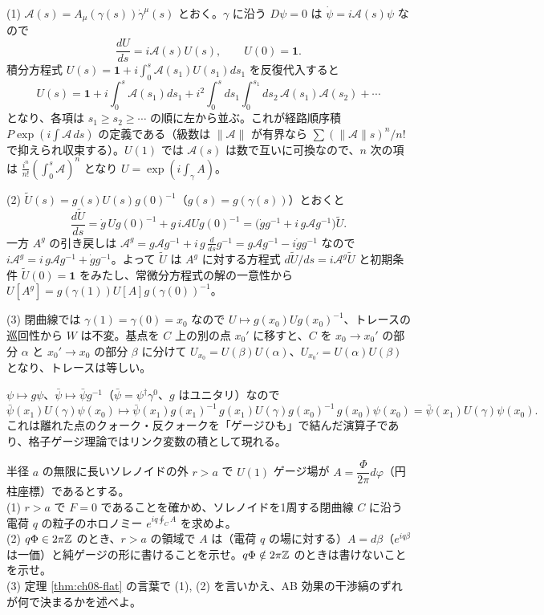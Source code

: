 \begin{solution}
(1) $\mathcal A(s)=A_\mu(\gamma(s))\dot\gamma^\mu(s)$ とおく。$\gamma$ に沿う $D\psi=0$ は $\dot\psi=i\mathcal A(s)\psi$ なので
\[
\frac{dU}{ds}=i\mathcal A(s)U(s),\qquad U(0)=\mathbf 1 .
\]
積分方程式 $U(s)=\mathbf 1+i\int_0^s\mathcal A(s_1)U(s_1)ds_1$ を反復代入すると
\[
U(s)=\mathbf 1+i\int_0^s\!\mathcal A(s_1)ds_1+i^2\!\int_0^s\!ds_1\!\int_0^{s_1}\!ds_2\,\mathcal A(s_1)\mathcal A(s_2)+\cdots
\]
となり、各項は $s_1\ge s_2\ge\cdots$ の順に左から並ぶ。これが経路順序積 $P\exp(i\int\mathcal A\,ds)$ の定義である（級数は $\lVert\mathcal A\rVert$ が有界なら $\sum(\lVert\mathcal A\rVert s)^n/n!$ で抑えられ収束する）。$U(1)$ では $\mathcal A(s)$ は数で互いに可換なので、$n$ 次の項は $\frac{i^n}{n!}(\int_0^s\mathcal A)^n$ となり $U=\exp(i\int_\gamma A)$。

(2) $\tilde U(s)=g(s)U(s)g(0)^{-1}$（$g(s)=g(\gamma(s))$）とおくと
\[
\frac{d\tilde U}{ds}=\dot g\,Ug(0)^{-1}+g\,i\mathcal AUg(0)^{-1}=\bigl(\dot g g^{-1}+i\,g\mathcal Ag^{-1}\bigr)\tilde U .
\]
一方 $A^g$ の引き戻しは $\mathcal A^g=g\mathcal Ag^{-1}+i\,g\,\tfrac{d}{ds}g^{-1}=g\mathcal Ag^{-1}-i\dot gg^{-1}$ なので $i\mathcal A^g=i\,g\mathcal Ag^{-1}+\dot gg^{-1}$。よって $\tilde U$ は $A^g$ に対する方程式 $d\tilde U/ds=i\mathcal A^g\tilde U$ と初期条件 $\tilde U(0)=\mathbf 1$ をみたし、常微分方程式の解の一意性から $U[A^g]=g(\gamma(1))U[A]g(\gamma(0))^{-1}$。

(3) 閉曲線では $\gamma(1)=\gamma(0)=x_0$ なので $U\mapsto g(x_0)Ug(x_0)^{-1}$、トレースの巡回性から $W$ は不変。基点を $C$ 上の別の点 $x_0'$ に移すと、$C$ を $x_0\to x_0'$ の部分 $\alpha$ と $x_0'\to x_0$ の部分 $\beta$ に分けて $U_{x_0}=U(\beta)U(\alpha)$、$U_{x_0'}=U(\alpha)U(\beta)$ となり、トレースは等しい。

$\psi\mapsto g\psi$、$\bar\psi\mapsto\bar\psi g^{-1}$（$\bar\psi=\psi^\dagger\gamma^0$、$g$ はユニタリ）なので
\[
\bar\psi(x_1)U(\gamma)\psi(x_0)\mapsto\bar\psi(x_1)g(x_1)^{-1}\,g(x_1)U(\gamma)g(x_0)^{-1}\,g(x_0)\psi(x_0)=\bar\psi(x_1)U(\gamma)\psi(x_0).
\]
これは離れた点のクォーク・反クォークを「ゲージひも」で結んだ演算子であり、格子ゲージ理論ではリンク変数の積として現れる。
\end{solution}

\begin{problem}[難易度 A]\label{ch08-prob-ab}
半径 $a$ の無限に長いソレノイドの外 $r>a$ で $U(1)$ ゲージ場が $A=\dfrac{\Phi}{2\pi}d\varphi$（円柱座標）であるとする。\\
(1) $r>a$ で $F=0$ であることを確かめ、ソレノイドを1周する閉曲線 $C$ に沿う電荷 $q$ の粒子のホロノミー $e^{iq\oint_CA}$ を求めよ。\\
(2) $q\Phi\in2\pi\mathbb{Z}$ のとき、$r>a$ の領域で $A$ は（電荷 $q$ の場に対する）$A=d\beta$（$e^{iq\beta}$ は一価）と純ゲージの形に書けることを示せ。$q\Phi\notin2\pi\mathbb{Z}$ のときは書けないことを示せ。\\
(3) 定理 \ref{thm:ch08-flat} の言葉で (1), (2) を言いかえ、AB 効果の干渉縞のずれが何で決まるかを述べよ。
\end{problem}

